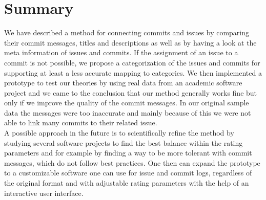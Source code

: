 \section{Summary}
\label{sec:summary}
We have described a method for connecting commits and issues by comparing their commit messages, titles and descriptions as well as by having a look at the meta information of issues and commits.
If the assignment of an issue to a commit is not possible, we propose a categorization of the issues and commits for supporting at least a less accurate mapping to categories.
We then implemented a prototype to test our theories by using real data from an academic software project and we came to the conclusion that our method generally works fine but only if we improve the quality of the commit messages.
In our original sample data the messages were too inaccurate and mainly because of this we were not able to link many commits to their related issue.\\
A possible approach in the future is to scientifically refine the method by studying several software projects to find the best balance within the rating parameters and for example by finding a way to be more tolerant with commit messages, which do not follow best practices.
One then can expand the prototype to a customizable software one can use for issue and commit logs, regardless of the original format and with adjustable rating parameters with the help of an interactive user interface.